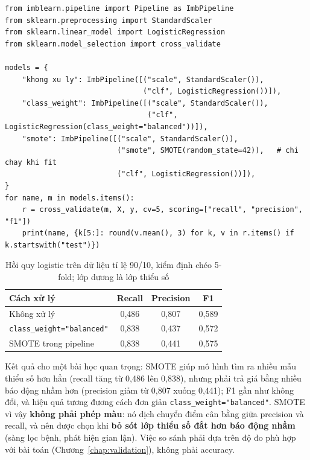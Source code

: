 \begin{lstlisting}[caption={So sánh các cách xử lý mất cân bằng trong Pipeline của imbalanced-learn}]
from imblearn.pipeline import Pipeline as ImbPipeline
from sklearn.preprocessing import StandardScaler
from sklearn.linear_model import LogisticRegression
from sklearn.model_selection import cross_validate

models = {
    "khong xu ly": ImbPipeline([("scale", StandardScaler()),
                                ("clf", LogisticRegression())]),
    "class_weight": ImbPipeline([("scale", StandardScaler()),
                                 ("clf", LogisticRegression(class_weight="balanced"))]),
    "smote": ImbPipeline([("scale", StandardScaler()),
                          ("smote", SMOTE(random_state=42)),   # chi chay khi fit
                          ("clf", LogisticRegression())]),
}
for name, m in models.items():
    r = cross_validate(m, X, y, cv=5, scoring=["recall", "precision", "f1"])
    print(name, {k[5:]: round(v.mean(), 3) for k, v in r.items() if k.startswith("test")})
\end{lstlisting}

\begin{table}[H]
\centering
\begin{tabular}{|l|c|c|c|}
\hline
\textbf{Cách xử lý} & \textbf{Recall} & \textbf{Precision} & \textbf{F1} \\
\hline
Không xử lý & 0,486 & 0,807 & 0,589 \\ \hline
\texttt{class\_weight="balanced"} & 0,838 & 0,437 & 0,572 \\ \hline
SMOTE trong pipeline & 0,838 & 0,441 & 0,575 \\ \hline
\end{tabular}
\caption{Hồi quy logistic trên dữ liệu tỉ lệ 90/10, kiểm định chéo 5-fold; lớp dương là lớp thiểu số}
\label{tab:smote-compare}
\end{table}

Kết quả cho một bài học quan trọng: SMOTE giúp mô hình tìm ra nhiều mẫu thiểu số hơn hẳn (recall tăng từ 0,486 lên 0,838), nhưng phải trả giá bằng nhiều báo động nhầm hơn (precision giảm từ 0,807 xuống 0,441); F1 gần như không đổi, và hiệu quả tương đương cách đơn giản \texttt{class\_weight="balanced"}. SMOTE vì vậy \textbf{không phải phép màu}: nó dịch chuyển điểm cân bằng giữa precision và recall, và nên được chọn khi \textbf{bỏ sót lớp thiểu số đắt hơn báo động nhầm} (sàng lọc bệnh, phát hiện gian lận). Việc so sánh phải dựa trên độ đo phù hợp với bài toán (Chương~\ref{chap:validation}), không phải accuracy.

